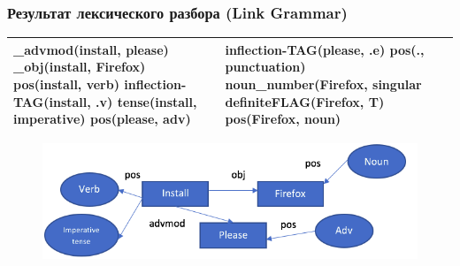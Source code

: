 \documentclass[14pt]{beamer}
\begin{document}
\begin{frame}
\frametitle{Результат лексического разбора (Link Grammar)}
\begin{table}
	
\small
\begin{tabular} {|p{5cm}|p{5cm}|}

\hline
 
\_advmod(install, please)
\_obj(install, Firefox)
pos(install, verb)
inflection-TAG(install, .v)
tense(install, imperative)
pos(please, adv)
 & 
inflection-TAG(please, .e)
pos(., punctuation)
noun\_number(Firefox, singular
definite\-FLAG(Firefox, T)
pos(Firefox, noun) 
    \\
   \hline
\end{tabular}
\end{table}

\begin{figure} [h] 
  \center
  \includegraphics [scale=0.45] {LexicalGraph1}
  \label{img:LexicalGraph1}  
\end{figure}
\end{frame}

\end{document}
